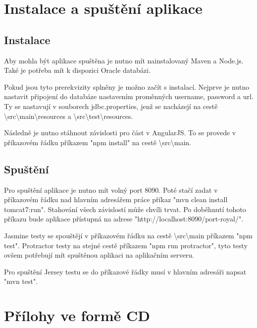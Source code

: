 \documentclass[czech,master,public,dept460,male,cpdeclaration,twoside]{diploma}
\begin{document}
\appendix
\section{Instalace a spuštění aplikace}

\subsection{Instalace}
Aby mohla být aplikace spuštěna je nutno mít nainstalovaný Maven a Node.js. Také je potřeba mít k dispozici Oracle databázi.

Pokud jsou tyto prerekvizity splněny je možno začít s instalací. Nejprve je nutno nastavit připojení do databáze nastavením proměnných username, password a url. Ty se nastavují v souborech jdbc.properties, jenž se nacházejí na cestě \textbackslash src\textbackslash main\textbackslash resources a \textbackslash src\textbackslash test\textbackslash resources.

Následně je nutno stáhnout závislosti pro část v AngularJS. To se provede v příkazovém řádku příkazem "npm install" na cestě \textbackslash src\textbackslash main.

\subsection{Spuštění}
Pro spuštění aplikace je nutno mít volný port 8090. Poté stačí zadat v příkazovém řádku nad hlavním adresářem práce příkaz "mvn clean install tomcat7:run". Stahování všech závislostí může chvíli trvat. Po doběhnutí tohoto příkazu bude aplikace přístupná na adrese "http://localhost:8090/port-royal/".

Jasmine testy se spouštějí v příkazovém řádku na cestě \textbackslash src\textbackslash main příkazem "npm test". Protractor testy na stejné cestě příkazem "npm run protractor", tyto testy ovšem potřebují mít spuštěnou aplikaci na aplikačním serveru.

Pro spuštění Jersey testu se do příkazové řádky musí v hlavním adresáři napsat "mvn test".

\section{Přílohy ve formě CD}
\end{document}
